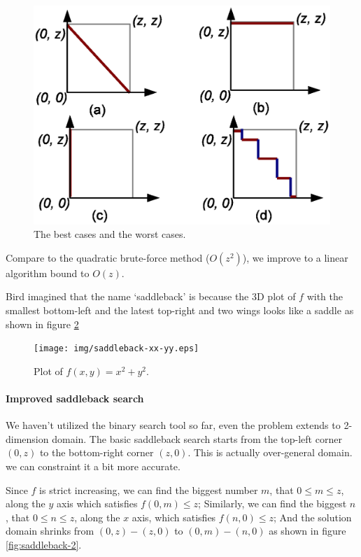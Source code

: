 \documentclass[UTF8]{article}
\begin{document}
\begin{figure}[htbp]
 \centering
 \includegraphics[scale=0.5]{img/saddleback-1-cases.eps}
 \caption{The best cases and the worst cases.}
 \label{fig:saddleback-1-cases}
\end{figure}

Compare to the quadratic brute-force method ($O(z^2)$), we improve to a linear algorithm bound to $O(z)$.

Bird imagined that the name `saddleback' is because the 3D plot of $f$ with the smallest bottom-left and the
latest top-right and two wings looks like a saddle as shown in figure \ref{fig:saddleback-frame}
\begin{figure}[htbp]
 \centering
 \texttt{[image: img/saddleback-xx-yy.eps]}
 \caption{Plot of $f(x, y) = x^2 + y^2$.}
 \label{fig:saddleback-frame}
\end{figure}

\paragraph{Improved saddleback search}

We haven't utilized the binary search tool so far, even the problem extends to 2-dimension domain.
The basic saddleback search starts from the top-left corner $(0, z)$ to the bottom-right corner $(z, 0)$.
This is actually over-general domain. we can constraint it a bit more accurate.

Since $f$ is strict increasing, we can find the biggest number $m$, that $0 \leq m \leq z$, along the
$y$ axis which satisfies $f(0, m) \leq z$; Similarly, we can find the biggest $n$, that $0 \leq n \leq z$,
along the $x$ axis, which satisfies $f(n, 0) \leq z$; And the solution domain shrinks
from $(0, z) - (z, 0)$ to $(0, m) - (n, 0)$ as shown in figure \ref{fig:saddleback-2}.
\end{document}
